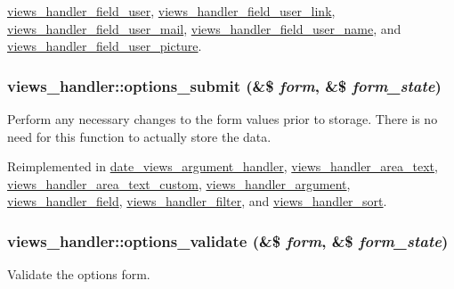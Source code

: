 \hyperlink{classviews__handler__field__user_aecf77682fa7dc9daf1fa97cbe045420d}{views\_\-handler\_\-field\_\-user}, \hyperlink{classviews__handler__field__user__link_a952944015feaaab1fb2d0abc29d5c2b5}{views\_\-handler\_\-field\_\-user\_\-link}, \hyperlink{classviews__handler__field__user__mail_aee55735f96178173853dbf1f8b293216}{views\_\-handler\_\-field\_\-user\_\-mail}, \hyperlink{classviews__handler__field__user__name_a0c3b7db3d060e384287fa62f348c9387}{views\_\-handler\_\-field\_\-user\_\-name}, and \hyperlink{classviews__handler__field__user__picture_a44c8350ed38c78e221297850e8235692}{views\_\-handler\_\-field\_\-user\_\-picture}.\hypertarget{classviews__handler_abb55e97dbb1e634b95a1cc9ea836d6e8}{
\subsubsection[{options\_\-submit}]{\setlength{\rightskip}{0pt plus 5cm}views\_\-handler::options\_\-submit (\&\$ {\em form}, \/  \&\$ {\em form\_\-state})}}
\label{classviews__handler_abb55e97dbb1e634b95a1cc9ea836d6e8}
Perform any necessary changes to the form values prior to storage. There is no need for this function to actually store the data. 

Reimplemented in \hyperlink{classdate__views__argument__handler_ac9c3618a380bf3dadb6500c5e4a32cb5}{date\_\-views\_\-argument\_\-handler}, \hyperlink{classviews__handler__area__text_a337ccf78771d5b61ba7ded71532f9b48}{views\_\-handler\_\-area\_\-text}, \hyperlink{classviews__handler__area__text__custom_a76f34efb470e6c03f7c67e655405e250}{views\_\-handler\_\-area\_\-text\_\-custom}, \hyperlink{classviews__handler__argument_ad9c8c040a47bd9910dbce31e8932b882}{views\_\-handler\_\-argument}, \hyperlink{classviews__handler__field_a58f6d9eb88577b3aef096386973fc9eb}{views\_\-handler\_\-field}, \hyperlink{classviews__handler__filter_ad93c8118dcd40fc5194a806e2986a300}{views\_\-handler\_\-filter}, and \hyperlink{classviews__handler__sort_a237ebc26eda2bb393e56f9cb9eea16da}{views\_\-handler\_\-sort}.\hypertarget{classviews__handler_a831c00b8cd3c667e25db014a3413273c}{
\subsubsection[{options\_\-validate}]{\setlength{\rightskip}{0pt plus 5cm}views\_\-handler::options\_\-validate (\&\$ {\em form}, \/  \&\$ {\em form\_\-state})}}
\label{classviews__handler_a831c00b8cd3c667e25db014a3413273c}
Validate the options form. 

